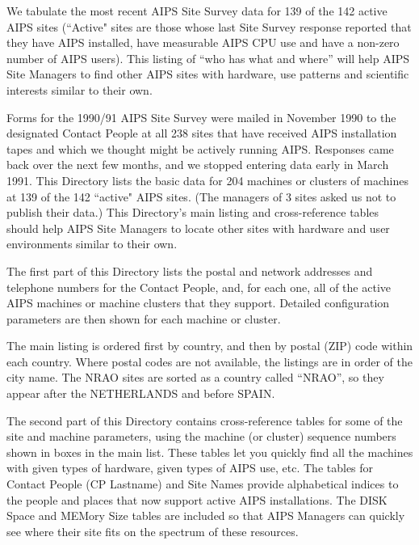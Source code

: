 \hskip0.5in

We tabulate the most recent AIPS Site Survey data for 139 of the 142
active AIPS sites (``Active" sites are those whose last Site Survey
response reported that they have AIPS installed, have measurable AIPS
CPU use and have a non-zero number of AIPS users).  This listing of
``who has what and where'' will help AIPS Site Managers to find other
AIPS sites with hardware, use patterns and scientific interests similar
to their own.

\V\V

\hskip0.5in

Forms for the 1990/91 AIPS Site Survey were mailed in November 1990 to
the designated Contact People at all 238 sites that have received AIPS
installation tapes and which we thought might be actively running AIPS.
Responses came back over the next few months, and we stopped entering
data early in March 1991.  This Directory lists the basic data for 204
machines or clusters of machines at 139 of the 142 ``active" AIPS sites.
(The managers of 3 sites asked us not to publish their data.) This
Directory's main listing and cross-reference tables should help AIPS
Site Managers to locate other sites with hardware and user environments
similar to their own.

The first part of this Directory lists the postal and network addresses
and telephone numbers for the Contact People, and, for each one, all of
the active AIPS machines or machine clusters that they support.  Detailed
configuration parameters are then shown for each machine or cluster.

The main listing is ordered first by country, and then by postal (ZIP)
code within each country.  Where postal codes are not available, the
listings are in order of the city name.  The NRAO sites are sorted as a
country called ``NRAO'', so they appear after the NETHERLANDS and before
SPAIN.

The second part of this Directory contains cross-reference tables for
some of the site and machine parameters, using the machine (or cluster)
sequence numbers shown in boxes in the main list.  These tables let you
quickly find all the machines with given types of hardware, given types
of AIPS use, etc.  The tables for Contact People (CP Lastname) and Site
Names provide alphabetical indices to the people and places that now
support active AIPS installations.  The DISK Space and MEMory Size
tables are included so that AIPS Managers can quickly see where their
site fits on the spectrum of these resources.

